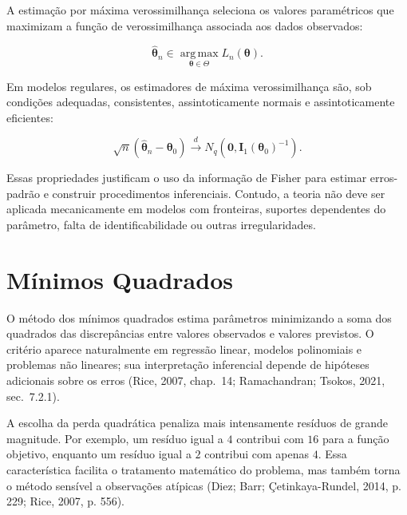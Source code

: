 \documentclass[
  letterpaper,
  DIV=11,
  numbers=noendperiod]{scrreprt}
\begin{document}
\begin{tcolorbox}[enhanced jigsaw, colback=white, leftrule=.75mm, colbacktitle=quarto-callout-note-color!10!white, breakable, titlerule=0mm, bottomtitle=1mm, title=\textcolor{quarto-callout-note-color}{\faInfo}\hspace{0.5em}{Síntese da seção}, colframe=quarto-callout-note-color-frame, toprule=.15mm, opacityback=0, bottomrule=.15mm, opacitybacktitle=0.6, arc=.35mm, toptitle=1mm, rightrule=.15mm, coltitle=black, left=2mm]

A estimação por máxima verossimilhança seleciona os valores paramétricos
que maximizam a função de verossimilhança associada aos dados
observados:

\[\widehat{\boldsymbol\theta}_n
\in
\operatorname*{arg\,max}_{\boldsymbol\theta\in\Theta}
L_n(\boldsymbol\theta).\]

Em modelos regulares, os estimadores de máxima verossimilhança são, sob
condições adequadas, consistentes, assintoticamente normais e
assintoticamente eficientes:

\[\sqrt n
\left(
\widehat{\boldsymbol\theta}_n
-
\boldsymbol\theta_0
\right)
\xrightarrow{d}
N_q
\left(
\mathbf{0},
\mathbf{I}_1(\boldsymbol\theta_0)^{-1}
\right).\]

Essas propriedades justificam o uso da informação de Fisher para estimar
erros-padrão e construir procedimentos inferenciais. Contudo, a teoria
não deve ser aplicada mecanicamente em modelos com fronteiras, suportes
dependentes do parâmetro, falta de identificabilidade ou outras
irregularidades.

\end{tcolorbox}

\section{Mínimos Quadrados}\label{sec-minimos-quadrados}

O método dos mínimos quadrados estima parâmetros minimizando a soma dos
quadrados das discrepâncias entre valores observados e valores
previstos. O critério aparece naturalmente em regressão linear, modelos
polinomiais e problemas não lineares; sua interpretação inferencial
depende de hipóteses adicionais sobre os erros (Rice, 2007, chap.~14;
Ramachandran; Tsokos, 2021, sec.~7.2.1).

A escolha da perda quadrática penaliza mais intensamente resíduos de
grande magnitude. Por exemplo, um resíduo igual a \(4\) contribui com
\(16\) para a função objetivo, enquanto um resíduo igual a \(2\)
contribui com apenas \(4\). Essa característica facilita o tratamento
matemático do problema, mas também torna o método sensível a observações
atípicas (Diez; Barr; Çetinkaya-Rundel, 2014, p. 229; Rice, 2007, p.
556).
\end{document}
